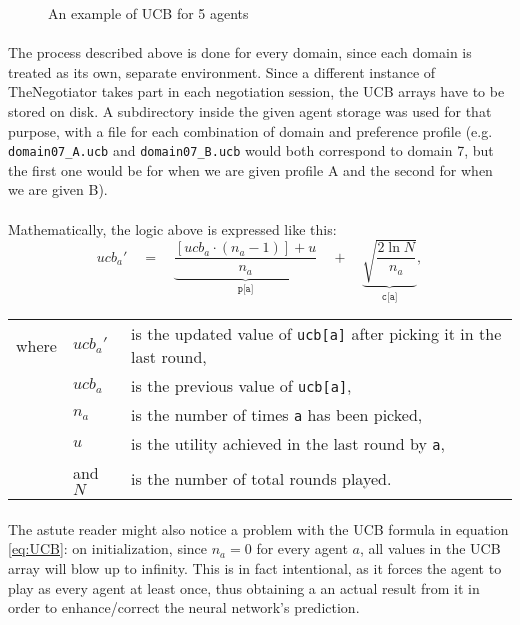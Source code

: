 \begin{figure}[H]
    \centering
    \captionsetup{justification=centering}
    \caption{An example of UCB for 5 agents}
    \label{fig:UCB_example}
\end{figure}

\paragraph*{}
The process described above is done for every domain, since each domain is treated as its own, separate environment. Since a different instance of TheNegotiator takes part in each negotiation session, the UCB arrays have to be stored on disk. A subdirectory inside the given agent storage was used for that purpose, with a file for each combination of domain and preference profile (e.g. \texttt{domain07\_A.ucb} and  \texttt{domain07\_B.ucb} would both correspond to domain 7, but the first one would be for when we are given profile A and the second for when we are given B).

\paragraph*{}
Mathematically, the logic above is expressed like this:
\begin{equation} \label{eq:UCB}
    {ucb_{a}}' \quad = \quad \underbrace{\frac{[ucb_{a} \cdot (n_{a}-1)]+u}{n_{a}}}_{\texttt{p[a]}} \quad + \quad \underbrace{\sqrt{\frac{2 \ln N}{n_{a}}}}_{\texttt{c[a]}},
\end{equation}
\vspace{-0.5cm}		%
\renewcommand{\arraystretch}{1} %
\begin{longtable}{l l l}
    where 	& ${ucb_{a}}'$	& is the updated value of \texttt{ucb[a]} after picking it in the last round, \\
            & $ucb_{a}$  	& is the previous value of \texttt{ucb[a]}, \\
            & $n_{a}$ 		& is the number of times \texttt{a} has been picked, \\
            & $u$ 			& is the utility achieved in the last round by \texttt{a}, \\
            & and $N$ 		& is the number of total rounds played. \\
\end{longtable}

\paragraph*{}
The astute reader might also notice a problem with the UCB formula in equation \ref{eq:UCB}: on initialization, since $n_{a}=0$ for every agent $a$, all values in the UCB array will blow up to infinity. This is in fact intentional, as it forces the agent to play as every agent at least once, thus obtaining a an actual result from it in order to enhance/correct the neural network's prediction.

